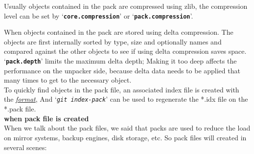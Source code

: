 \documentclass[12pt,oneside]{article}
\newcommand{\code}[1]{\texttt{#1}}
\begin{document}
Usually objects contained in the pack are compressed using zlib, the compression level
can be set by `\textbf{\code{core.compression}}' or `\textbf{\code{pack.compression}}'.

When objects contained in the pack are stored using delta compression. The objects
are first internally sorted by type, size and optionally names and compared against
the other objects to see if using delta compression saves space. `\textbf{\code{pack.depth}}'
limits the maximum delta depth; Making it too deep affects the performance on the unpacker side,
because delta data needs to be applied that many times to get to the necessary object.
\\

To quickly find objects in the pack file, an associated index file is created with the
\emph{\href{https://github.com/git/git/blob/master/Documentation/technical/pack-format.txt\#L161}{format}},
And `\emph{\code{git index-pack}}' can be used to regenerate the *.idx file on the *.pack file.
\\

\textbullet\textbf{\large{ when pack file is created}}\\

When we talk about the pack files, we said that packs are used to reduce the load on mirror systems,
backup engines, disk storage, etc. So pack files will created in several scenes:
\end{document}

